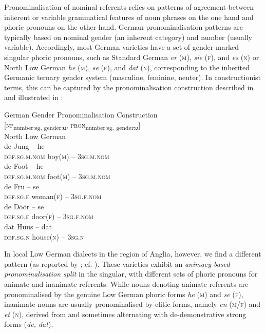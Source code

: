 \documentclass[output=paper]{langsci/langscibook}
\begin{document}
Pronominalisation of nominal referents relies on patterns of agreement between inherent or variable grammatical features of noun phrases on the one hand and phoric pronouns on the other hand. German pronominalisation patterns are typically based on nominal gender (an inherent category) and number (usually variable). Accordingly, most German varieties have a set of gender-marked singular phoric pronouns, such as Standard German \textit{er} (\textsc{m}), \textit{sie} (\textsc{f}), and \textit{es} (\textsc{n}) or North Low German \textit{he} (\textsc{m}), \textit{se} (\textsc{f}), and \textit{dat} (\textsc{n}), corresponding to the inherited Germanic ternary gender system (masculine, feminine, neuter). In constructionist terms, this can be captured by the pronominalisation construction described in  and illustrated in :

\ea
\label{ex:hoeder:10}
	German Gender Pronominalisation Construction\\
     {[}\textsc{np}\textsubscript{number:sg, gender:}\textsubscript{α}, \textsc{pron}\textsubscript{number:sg,} \textsubscript{gender:}\textsubscript{α}{]}\\
\ex \label{ex:hoeder:11}
	North Low German\\
	\ea\label{ex:hoeder:11a}	
	\gll de Jung – he\\
     \textsc{def.sg.m.nom}{} boy(\textsc{m}) – 3\textsc{sg.m.nom}\\
 
	\ex \label{ex:hoeder:11b}
	\gll de Foot – he\\
     \textsc{def.sg.m.nom}{} foot(\textsc{m}) – 3\textsc{sg.m.nom}\\
     
     \ex \label{ex:hoeder:11c}
	\gll de Fru – se\\
     \textsc{def.sg.f} woman(\textsc{f}) – 3\textsc{sg.f.nom}\\

	\ex \label{ex:hoeder:11d}
	\gll de Döör – se\\
     \textsc{def.sg.f} door(\textsc{f}) – 3\textsc{sg.f.nom}\\
     
     \ex \label{ex:hoeder:11e}
	\gll dat Huus – dat\\
     \textsc{def.sg.n}{} house(\textsc{n}) – 3\textsc{sg.n}\\
     
     \z
     \z
     
In local Low German dialects in the region of Anglia, however, we find a different pattern (as reported by \citealt[76, 87–88]{Bock.1933}; cf. \citealt[123--124]{Hoder.2016a}). These varieties exhibit an \textit{animacy-based pronominalisation split} in the singular, with different sets of phoric{} pronouns for animate and inanimate referents: While nouns denoting animate referents are pronominalised by the genuine Low German phoric forms \textit{he} (\textsc{m}) and \textit{se} (\textsc{f}), inanimate nouns are usually pronominalised by clitic forms, namely \textit{en} (\textsc{m/f}) and \textit{et} (\textsc{n}), derived from and sometimes alternating with de-demonstrative strong forms (\textit{de, dat}).
\end{document}
